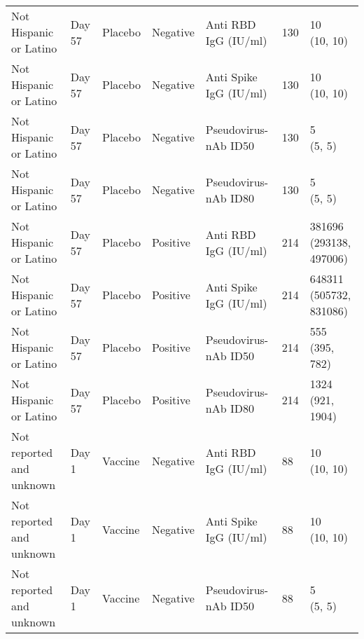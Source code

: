 \documentclass[]{book}
\theoremstyle{definition}
\theoremstyle{definition}
\theoremstyle{definition}
\newcommand{\1}{\mathbbm{1}}
\begin{document}
\begin{landscape}
\begin{ThreePartTable}
\begin{longtable}[t]{>{\raggedright\arraybackslash}p{7cm}llllll}
\hspace{1em}Not Hispanic or Latino & Day 57 & Placebo & Negative & Anti RBD IgG (IU/ml) & 130 & \makecell[l]{10\\(10, 10)}\\
\hspace{1em}Not Hispanic or Latino & Day 57 & Placebo & Negative & Anti Spike IgG (IU/ml) & 130 & \makecell[l]{10\\(10, 10)}\\
\hspace{1em}Not Hispanic or Latino & Day 57 & Placebo & Negative & Pseudovirus-nAb ID50 & 130 & \makecell[l]{5\\(5, 5)}\\
\hspace{1em}Not Hispanic or Latino & Day 57 & Placebo & Negative & Pseudovirus-nAb ID80 & 130 & \makecell[l]{5\\(5, 5)}\\
\hspace{1em}Not Hispanic or Latino & Day 57 & Placebo & Positive & Anti RBD IgG (IU/ml) & 214 & \makecell[l]{381696\\(293138, 497006)}\\
\hspace{1em}Not Hispanic or Latino & Day 57 & Placebo & Positive & Anti Spike IgG (IU/ml) & 214 & \makecell[l]{648311\\(505732, 831086)}\\
\hspace{1em}Not Hispanic or Latino & Day 57 & Placebo & Positive & Pseudovirus-nAb ID50 & 214 & \makecell[l]{555\\(395, 782)}\\
\hspace{1em}Not Hispanic or Latino & Day 57 & Placebo & Positive & Pseudovirus-nAb ID80 & 214 & \makecell[l]{1324\\(921, 1904)}\\
\hspace{1em}Not reported and unknown & Day 1 & Vaccine & Negative & Anti RBD IgG (IU/ml) & 88 & \makecell[l]{10\\(10, 10)}\\
\hspace{1em}Not reported and unknown & Day 1 & Vaccine & Negative & Anti Spike IgG (IU/ml) & 88 & \makecell[l]{10\\(10, 10)}\\
\hspace{1em}Not reported and unknown & Day 1 & Vaccine & Negative & Pseudovirus-nAb ID50 & 88 & \makecell[l]{5\\(5, 5)}\\

\end{longtable}
\end{ThreePartTable}
\end{landscape}
\end{document}
